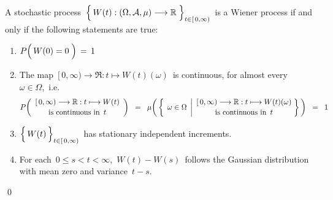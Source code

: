 \vskip 0.5cm
\begin{theorem}
\mbox{}
\vskip 0.2cm
\noindent
A stochastic process
\,$\left\{\,\overset{{\color{white}.}}{W}(t) : (\Omega,\mathcal{A},\mu) \longrightarrow \Re \;\right\}_{t \in[\,0,\infty)}$\,
is a Wiener process if and only if the following statements are true:
\begin{enumerate}
\item
	$P\!\left(\,W(0) \overset{{\color{white}-}}{=} 0 \;\right) \, = \, 1$
\item
	The map
	\,$[\,0,\infty) \longrightarrow \Re : t \longmapsto W(t)(\omega)$\,
	is continuous, for almost every \,$\omega \in \Omega$,\, i.e.
	\begin{equation*}
	P\!\left(
		\begin{array}{c}
		[\,0,\infty) \longrightarrow \Re : t \longmapsto W(t)
		\\
		\overset{{\color{white}.}}{\textnormal{is continuous in \,$t$}}
		\end{array}
		\right)
	\;\; = \;\;
	\mu\!\left(\,\left\{\;\,
		\omega \in \Omega
		\;\left\vert
		\begin{array}{c}
		[\,0,\infty) \longrightarrow \Re : t \longmapsto W(t)(\omega)
		\\
		\overset{{\color{white}.}}{\textnormal{is continuous in \,$t$}}
		\end{array}
		\right.
		\!\!\right\}\,\right)
	\;\; = \;\; 1
	\end{equation*}
\item
	$\left\{\,\overset{{\color{white}.}}{W}(t)\,\right\}_{t \in[\,0,\infty)}$\,
	has stationary independent increments.
\item
	For each \,$0 \leq s < t < \infty$,
	\,$W(t) - W(s)$\, follows the Gaussian distribution with mean zero and variance \,$t-s$.
\end{enumerate}
\end{theorem}
\proof
\qed

